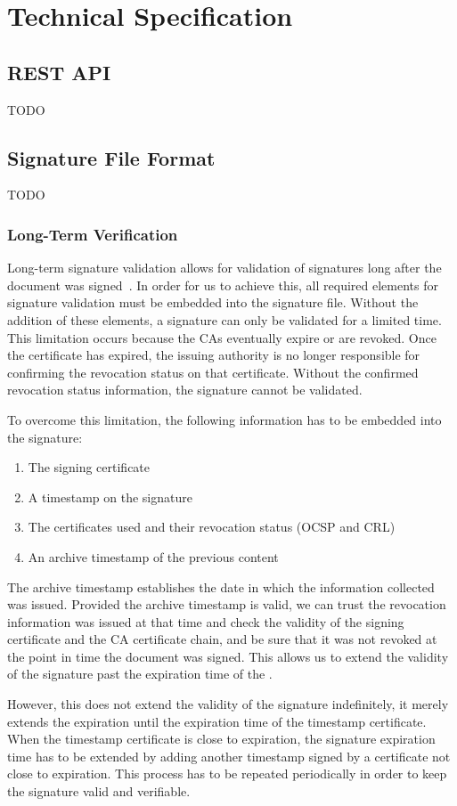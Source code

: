 \chapter{Technical Specification}
\section{REST API}
TODO
\section{Signature File Format}
TODO
\subsection{Long-Term Verification}
Long-term signature validation allows for validation of signatures long after the document was signed~\cite{etsipades}.
In order for us to achieve this, all required elements for signature validation must be embedded into the signature file.
Without the addition of these elements, a signature can only be validated for a limited time.
This limitation occurs because the \gls{CA}s eventually expire or are revoked.
Once the  certificate has expired, the issuing authority is no longer responsible for confirming the revocation status on that certificate.
Without the confirmed revocation status information, the signature cannot be validated.

To overcome this limitation, the following information has to be embedded into the signature:
\begin{enumerate}
    \item The signing certificate
    \item A timestamp on the signature
    \item The certificates used and their revocation status (\gls{OCSP} and \gls{CRL})
    \item An archive timestamp of the previous content
\end{enumerate}

The archive timestamp establishes the date in which the information collected was issued.
Provided the archive timestamp is valid,
we can trust the revocation information was issued at that time and check the validity of the signing certificate and the \gls{CA} certificate chain,
and be sure that it was not revoked at the point in time the document was signed.
This allows us to extend the validity of the signature past the expiration time of the .

However, this does not extend the validity of the signature indefinitely,
it merely extends the expiration until the expiration time of the timestamp certificate.
When the timestamp certificate is close to expiration,
the signature expiration time has to be extended by adding another timestamp signed by a certificate not close to expiration.
This process has to be repeated periodically in order to keep the signature valid and verifiable.

